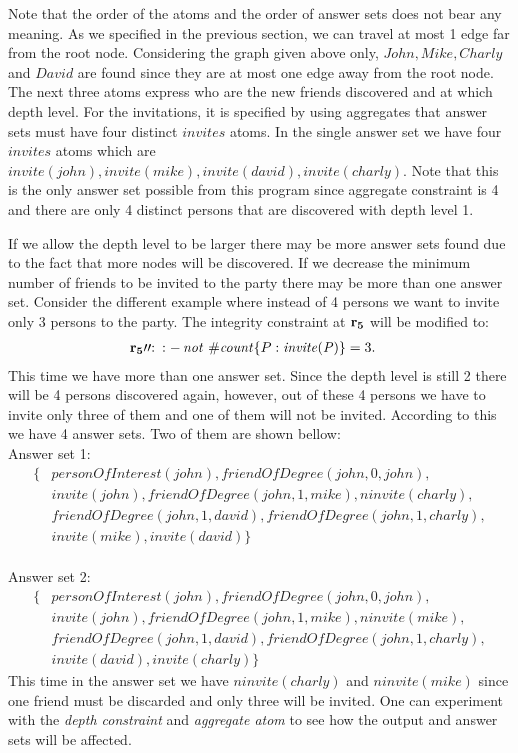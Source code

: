 \documentclass[a4paper, titlepage]{article}
\DeclareMathOperator{\leftimpl}{:-}
\DeclareMathOperator{\nott}{\mathit{not}}
\newcommand{\row}[1]{%
  \ensuremath{\color{black}\ensuremath{\mathbf{#1}} \color{black}}%
}
\newcommand{\rowprefixprimeprime}[1]{%
  \ensuremath{\color{black}\mathbf{#1\prime\prime{:}}\ }%
}
\begin{document}
Note that the order of the atoms and the order of answer sets 
does not bear any meaning. As we specified in the previous 
section, we can travel at most 1 edge far from the root 
node. Considering the graph given above only, $\mathit{John, 
Mike, Charly}$ and $\mathit{David}$ are found since they 
are at most one edge away from the root node. The next three atoms 
express who are the new friends discovered and at which 
depth 
level. For the invitations, it is specified by using 
aggregates that answer sets must have four distinct 
$\mathit{invites}$ atoms.
In the single answer set we have four $\mathit{invites}$ atoms 
which are $\mathit{invite(john), 
invite(mike), invite(david), invite(charly)}$. Note that 
this is the only answer set possible 
from this program since aggregate constraint is 4 and there 
are only 4 distinct persons that are discovered with depth 
level 1. 

If we allow the depth level to be larger there may be more 
answer sets found due to the fact that more nodes will be 
discovered. If we decrease the minimum number of friends to be 
invited to the party there may be more than one answer set. 
Consider the different example where instead of 4 
persons we want to invite only 3 persons to the party. 
The integrity constraint at $\row{r_5}$ will be modified to:
\begin{align*}
& \rowprefixprimeprime{r_5} \leftimpl \nott \thinspace \mathit{\#count} \{ P : \mathit{invite(P)} \} = 3.
\end{align*} 
 This time we have more than one answer set. Since the depth 
 level is still 2 there will be 4 persons discovered again, 
 however, out of these 4 persons we have to invite only 
 three of them and one of them will not be invited. 
 According to this we have 4 answer sets. Two of them are 
 shown bellow:\\
Answer set 1:
\begin{align*}
   \{ &\mathit{personOfInterest(john), 
      friendOfDegree(john,0,john),}\\
      &\mathit{invite(john), friendOfDegree(john,1,mike), 
      \mathit{ninvite(charly)},}\\
      &\mathit{friendOfDegree(john,1,david), 
      friendOfDegree(john,1,charly),}\\
      &\mathit{invite(mike),invite(david)}  \}
 \end{align*}
\\ Answer set 2:
 \begin{align*}
   \{&\mathit{personOfInterest(john), 
   friendOfDegree(john,0,john),} \\
   &\mathit{invite(john), friendOfDegree(john,1,mike), 
   \mathit{ninvite(mike)},}\\
   &\mathit{friendOfDegree(john,1,david), 
   friendOfDegree(john,1,charly),} \\
   &\mathit{invite(david),invite(charly)}\}
 \end{align*}
 This time in the answer set we have 
$\mathit{ninvite(charly)}$ and $\mathit{ninvite(mike)}$ 
since one friend must be discarded and only three will be 
invited. One can experiment with the \emph{depth constraint} and 
\emph{aggregate atom} to see how the output and 
answer sets will be affected.    
\end{document}
